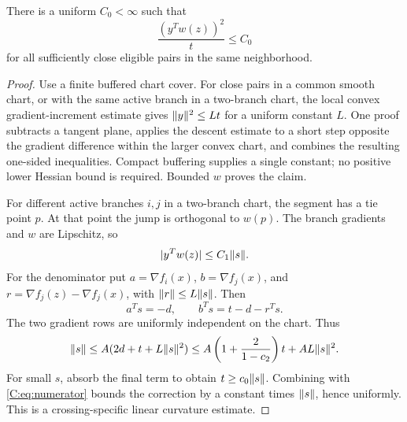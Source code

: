 \begin{lemma}\label{C:lem:secant}
There is a uniform $C_0<\infty$ such that
\[
 \frac{(y^Tw(z))^2}{t}\le C_0
\]
for all sufficiently close eligible pairs in the same neighborhood.
\end{lemma}
\begin{proof}
Use a finite buffered chart cover. For close pairs in a common smooth chart, or with the same active branch in a two-branch chart, the local convex gradient-increment estimate gives $\lVert y\rVert^2\le L t$ for a uniform constant $L$. One proof subtracts a tangent plane, applies the descent estimate to a short step opposite the gradient difference within the larger convex chart, and combines the resulting one-sided inequalities. Compact buffering supplies a single constant; no positive lower Hessian bound is required. Bounded $w$ proves the claim.

For different active branches $i,j$ in a two-branch chart, the segment has a tie point $p$. At that point the jump is orthogonal to $w(p)$. The branch gradients and $w$ are Lipschitz, so
\begin{equation}\label{C:eq:numerator}
 |y^Tw(z)|\le C_1\lVert s\rVert.
\end{equation}
For the denominator put $a=\nabla f_i(x)$, $b=\nabla f_j(x)$, and $r=\nabla f_j(z)-\nabla f_j(x)$, with $\lVert r\rVert\le L\lVert s\rVert$. Then
\[
 a^Ts=-d,\qquad b^Ts=t-d-r^Ts.
\]
The two gradient rows are uniformly independent on the chart. Thus
\[
 \lVert s\rVert\le A(2d+t+L\lVert s\rVert^2)
 \le A\left(1+\frac{2}{1-c_2}\right)t+AL\lVert s\rVert^2.
\]
For small $s$, absorb the final term to obtain $t\ge c_0\lVert s\rVert$. Combining with \eqref{C:eq:numerator} bounds the correction by a constant times $\lVert s\rVert$, hence uniformly. This is a crossing-specific linear curvature estimate.
\end{proof}


\setcounter{section}{5}
\setcounter{theorem}{7}
\setcounter{equation}{15}


